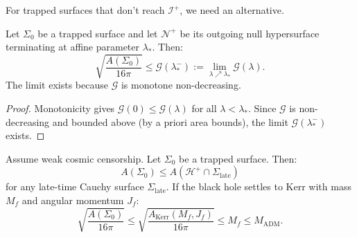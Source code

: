 For trapped surfaces that don't reach $\mathscr{I}^+$, we need an alternative.

\begin{theorem}\label{thm:partialmonotone}
Let $\Sigma_0$ be a trapped surface and let $\mathcal{N}^+$ be its outgoing null hypersurface terminating at affine parameter $\lambda_*$. Then:
\begin{equation}
    \sqrt{\frac{A(\Sigma_0)}{16\pi}} \leq \mathcal{G}(\lambda_*^-) := \lim_{\lambda \nearrow \lambda_*} \mathcal{G}(\lambda).
\end{equation}
The limit exists because $\mathcal{G}$ is monotone non-decreasing.
\end{theorem}

\begin{proof}
Monotonicity gives $\mathcal{G}(0) \leq \mathcal{G}(\lambda)$ for all $\lambda < \lambda_*$. Since $\mathcal{G}$ is non-decreasing and bounded above (by a priori area bounds), the limit $\mathcal{G}(\lambda_*^-)$ exists.
\end{proof}

\begin{theorem}\label{thm:penrosehawking}
Assume weak cosmic censorship. Let $\Sigma_0$ be a trapped surface. Then:
\begin{equation}
    A(\Sigma_0) \leq A(\mathcal{H}^+ \cap \Sigma_{\text{late}})
\end{equation}
for any late-time Cauchy surface $\Sigma_{\text{late}}$. If the black hole settles to Kerr with mass $M_f$ and angular momentum $J_f$:
\begin{equation}
    \sqrt{\frac{A(\Sigma_0)}{16\pi}} \leq \sqrt{\frac{A_{\text{Kerr}}(M_f, J_f)}{16\pi}} \leq M_f \leq M_{\mathrm{ADM}}.
\end{equation}
\end{theorem}

